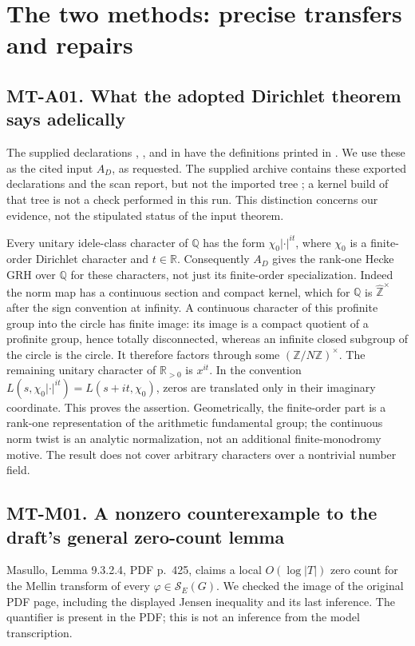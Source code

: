 \documentclass[11pt,a4paper]{article}
\begin{document}

\section{The two methods: precise transfers and repairs}
\label{sec:methods}

\subsection*{MT-A01. What the adopted Dirichlet theorem says adelically}
The supplied declarations ,
, and
 in  have the
definitions printed in .  We use these as the
cited input $A_D$, as requested.  The supplied archive contains these exported
declarations and the scan report, but not the imported tree
; a kernel build of that tree is
not a check performed in this run.  This distinction concerns our evidence,
not the stipulated status of the input theorem.

Every unitary idele-class character of $\mathbb Q$ has the form
$\chi_0|\cdot|^{it}$, where $\chi_0$ is a finite-order Dirichlet character
and $t\in\mathbb R$.  Consequently $A_D$ gives the rank-one Hecke GRH over
$\mathbb Q$ for these characters, not just its finite-order specialization.
Indeed the norm map has a continuous section and compact kernel, which for
$\mathbb Q$ is $\widehat{\mathbb Z}^{\times}$ after the sign convention at
infinity.  A continuous character of this profinite group into the circle has
finite image: its image is a compact quotient of a profinite group, hence
totally disconnected, whereas an infinite closed subgroup of the circle is
the circle.  It therefore factors through some
$(\mathbb Z/N\mathbb Z)^\times$.  The remaining unitary character of
$\mathbb R_{>0}$ is $x^{it}$.  In the convention
$L(s,\chi_0|\cdot|^{it})=L(s+it,\chi_0)$, zeros are translated only in
their imaginary coordinate.  This proves the assertion.  Geometrically,
the finite-order part is a rank-one representation of the arithmetic
fundamental group; the continuous norm twist is an analytic normalization,
not an additional finite-monodromy motive.  The result does not cover
arbitrary characters over a nontrivial number field.

\subsection*{MT-M01. A nonzero counterexample to the draft's general zero-count lemma}
Masullo, Lemma 9.3.2.4, PDF p.~425, claims a local $O(\log |T|)$ zero count
for the Mellin transform of every $\varphi\in\mathcal S_E(G)$.
We checked the image of the original PDF page, including the displayed
Jensen inequality and its last inference.  The quantifier is present in the
PDF; this is not an inference from the model transcription.
\end{document}
